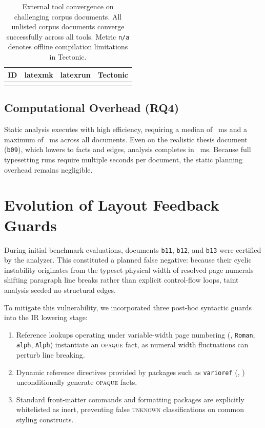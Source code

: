 \documentclass[conference]{IEEEtran}
\newcommand{\cls}[1]{\textsc{#1}}
\newcommand{\tex}[1]{\texttt{\detokenize{#1}}}
\begin{document}
\begin{table}[t]
\caption{External tool convergence on challenging corpus documents. All unlisted corpus documents converge successfully across all tools. Metric \texttt{n/a} denotes offline compilation limitations in Tectonic.}
\label{tab:external}
\centering
\footnotesize
\begin{tabular}{@{}lccc@{}}
\toprule
ID & latexmk & latexrun & Tectonic \\
\midrule
\\
\bottomrule
\end{tabular}
\end{table}

\subsection{Computational Overhead (RQ4)}

Static analysis executes with high efficiency, requiring a median of \LatencyMedian{}~ms and a maximum of \LatencyMax{}~ms across all documents. Even on the realistic thesis document (\texttt{b09}), which lowers to \ThesisFacts{} facts and \ThesisEdges{} edges, analysis completes in \ThesisLatency{}~ms. Because full typesetting runs require multiple seconds per document, the static planning overhead remains negligible.

\section{Evolution of Layout Feedback Guards}
\label{sec:guard}

During initial benchmark evaluations, documents \texttt{b11}, \texttt{b12}, and \texttt{b13} were certified by the analyzer. This constituted a planned false negative: because their cyclic instability originates from the typeset physical width of resolved page numerals shifting paragraph line breaks rather than explicit control-flow loops, taint analysis seeded no structural edges.

To mitigate this vulnerability, we incorporated three post-hoc syntactic guards into the IR lowering stage:
\begin{enumerate}
\item Reference lookups operating under variable-width page numbering (\tex{\pagenumbering{roman}}, \texttt{Roman}, \texttt{alph}, \texttt{Alph}) instantiate an \cls{opaque} fact, as numeral width fluctuations can perturb line breaking.
\item Dynamic reference directives provided by packages such as \texttt{varioref} (\tex{\vref}, \tex{\vpageref}) unconditionally generate \cls{opaque} facts.
\item Standard front-matter commands and formatting packages are explicitly whitelisted as inert, preventing false \cls{unknown} classifications on common styling constructs.
\end{enumerate}
\end{document}
